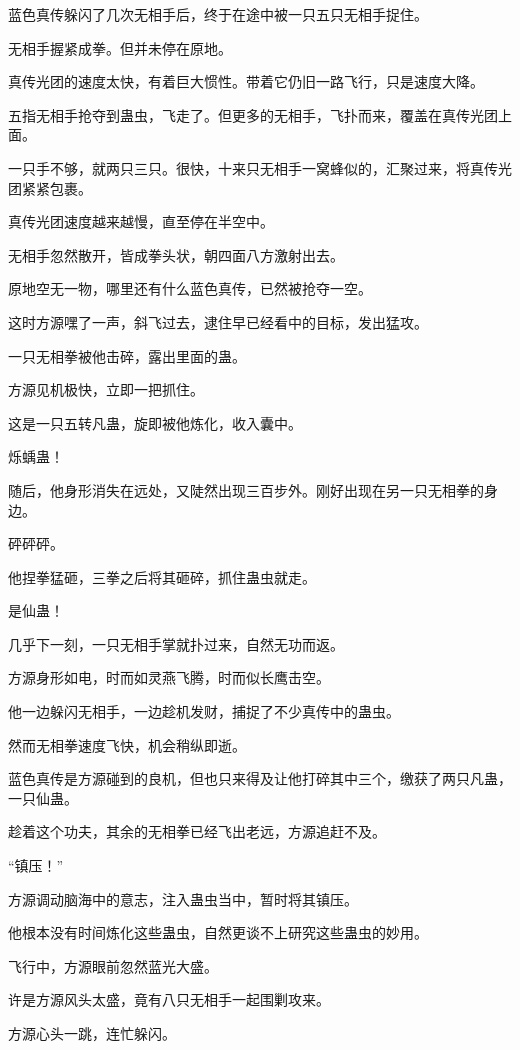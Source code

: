 \begin{this_body}
蓝色真传躲闪了几次无相手后，终于在途中被一只五只无相手捉住。

无相手握紧成拳。但并未停在原地。

真传光团的速度太快，有着巨大惯性。带着它仍旧一路飞行，只是速度大降。

五指无相手抢夺到蛊虫，飞走了。但更多的无相手，飞扑而来，覆盖在真传光团上面。

一只手不够，就两只三只。很快，十来只无相手一窝蜂似的，汇聚过来，将真传光团紧紧包裹。

真传光团速度越来越慢，直至停在半空中。

无相手忽然散开，皆成拳头状，朝四面八方激射出去。

原地空无一物，哪里还有什么蓝色真传，已然被抢夺一空。

这时方源嘿了一声，斜飞过去，逮住早已经看中的目标，发出猛攻。

一只无相拳被他击碎，露出里面的蛊。

方源见机极快，立即一把抓住。

这是一只五转凡蛊，旋即被他炼化，收入囊中。

烁蝺蛊！

随后，他身形消失在远处，又陡然出现三百步外。刚好出现在另一只无相拳的身边。

砰砰砰。

他捏拳猛砸，三拳之后将其砸碎，抓住蛊虫就走。

是仙蛊！

几乎下一刻，一只无相手掌就扑过来，自然无功而返。

方源身形如电，时而如灵燕飞腾，时而似长鹰击空。

他一边躲闪无相手，一边趁机发财，捕捉了不少真传中的蛊虫。

然而无相拳速度飞快，机会稍纵即逝。

蓝色真传是方源碰到的良机，但也只来得及让他打碎其中三个，缴获了两只凡蛊，一只仙蛊。

趁着这个功夫，其余的无相拳已经飞出老远，方源追赶不及。

“镇压！”

方源调动脑海中的意志，注入蛊虫当中，暂时将其镇压。

他根本没有时间炼化这些蛊虫，自然更谈不上研究这些蛊虫的妙用。

飞行中，方源眼前忽然蓝光大盛。

许是方源风头太盛，竟有八只无相手一起围剿攻来。

方源心头一跳，连忙躲闪。


\end{this_body}
